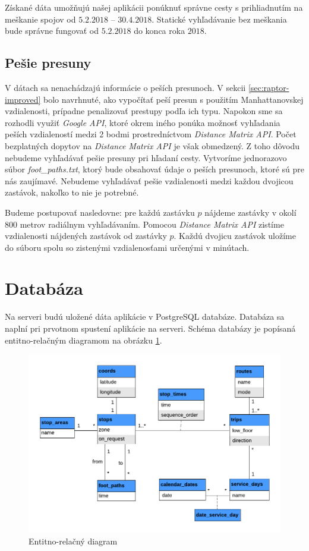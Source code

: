 Získané dáta umožňujú našej aplikácii ponúknuť správne cesty s prihliadnutím na meškanie spojov od $5.2.2018$ – $30.4.2018$. Statické vyhľadávanie bez meškania bude správne fungovať od $5.2.2018$ do konca roka $2018$.


\subsection{Pešie presuny}
\label{sec:foot-paths}
V dátach sa nenachádzajú informácie o peších presunoch. V sekcii \ref{sec:raptor-improved} bolo navrhnuté, ako vypočítať peší presun s použitím Manhattanovskej vzdialenosti, prípadne penalizovať prestupy podľa ich typu. Napokon sme sa rozhodli využiť   \textit{Google API}, ktoré okrem iného ponúka možnosť vyhľadania peších vzdialeností medzi 2 bodmi prostredníctvom \textit{Distance Matrix API}. Počet bezplatných dopytov na \textit{Distance Matrix API} je však obmedzený. Z toho dôvodu nebudeme vyhľadávať pešie presuny pri hľadaní cesty. Vytvoríme jednorazovo súbor \textit{foot\_paths.txt}, ktorý bude obsahovať údaje o peších presunoch, ktoré sú pre nás zaujímavé. Nebudeme vyhľadávať pešie vzdialenosti medzi každou dvojicou zastávok, nakoľko to nie je potrebné. 

Budeme postupovať nasledovne: pre každú zastávku $p$ nájdeme zastávky v okolí 800 metrov radiálnym vyhľadávaním. Pomocou \textit{Distance Matrix API} zistíme vzdialenosti nájdených zastávok od zastávky $p$. Každú dvojicu zastávok uložíme do súboru spolu so zistenými vzdialenosťami určenými v minútach.

\section{Databáza}

Na serveri budú uložené dáta aplikácie v PostgreSQL databáze. Databáza sa naplní pri prvotnom spustení aplikácie na serveri. Schéma databázy je popísaná entitno-relačným diagramom na obrázku \ref{fig:erd}.

\begin{figure}[H]
\centerline{\includegraphics[width=1.0\textwidth]{images/ERD}}
\caption[Entitno-relačný diagram]{Entitno-relačný diagram}
\label{fig:erd}
\end{figure}

